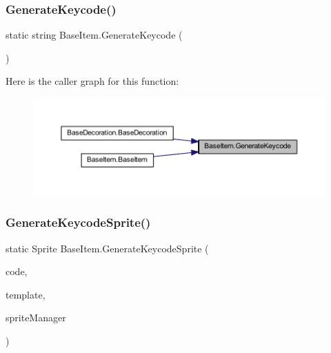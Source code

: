 \subsubsection{\texorpdfstring{GenerateKeycode()}{GenerateKeycode()}}
{\footnotesize\ttfamily static string Base\+Item.\+Generate\+Keycode (\begin{DoxyParamCaption}{ }\end{DoxyParamCaption})\hspace{0.3cm}{\ttfamily [static]}}

Here is the caller graph for this function\+:
\nopagebreak
\begin{figure}[H]
\begin{center}
\leavevmode
\includegraphics[width=350pt]{class_base_item_aa3a6bc4a2af6c424898277764e9c0585_icgraph}
\end{center}
\end{figure}
\mbox{\label{class_base_item_a0bb5888f3371b291645137272f417b30}} 
\subsubsection{\texorpdfstring{GenerateKeycodeSprite()}{GenerateKeycodeSprite()}}
{\footnotesize\ttfamily static Sprite Base\+Item.\+Generate\+Keycode\+Sprite (\begin{DoxyParamCaption}\item[{string}]{code,  }\item[{Sprite}]{template,  }\item[{\mbox{\hyperlink{class_sprite_manager}{Sprite\+Manager}}}]{sprite\+Manager }\end{DoxyParamCaption})\hspace{0.3cm}{\ttfamily [static]}}

